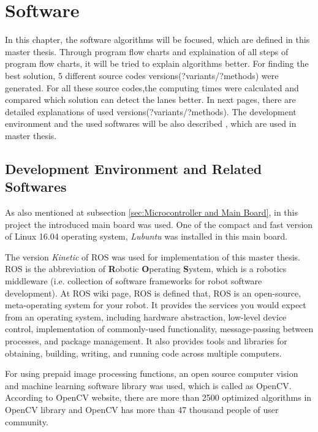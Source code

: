 %
\section{Software}\label{sec:Software}


In this chapter, the software algorithms will be focused, which are defined in this master thesis.  Through program flow charts and explaination of all steps of program flow charts, it will be tried to explain algorithms better. For finding the best solution, 5 different source codes versions(?variants/?methods) were generated. For all these source codes,the computing times were calculated and compared which solution can detect the lanes better. In next pages, there are detailed explanations of used versions(?variants/?methods). The development environment and the used softwares will be also described , which are used in master thesis.

%
\subsection{Development Environment and Related Softwares}
\label{sec:Development Environment and Related Softwares}

As also mentioned at subsection \ref{sec:Microcontroller and Main Board}, in this project the introduced main board was used. One of the compact and fast version of Linux 16.04 operating system, \textit{Lubuntu} was installed in this main board.

The version \textit{Kinetic} of ROS was used for implementation of this master thesis. ROS is the abbreviation of \textbf{R}obotic \textbf{O}perating \textbf{S}ystem, which is a robotics middleware (i.e. collection of software frameworks for robot software development). At ROS wiki page\cite{ROS}, ROS is defined that, ROS is an open-source, meta-operating system for your robot. It provides the services you would expect from an operating system, including hardware abstraction, low-level device control, implementation of commonly-used functionality, message-passing between processes, and package management. It also provides tools and libraries for obtaining, building, writing, and running code across multiple computers.

For using prepaid image processing functions, an open source computer vision and machine learning software library was used, which is called as OpenCV. According to OpenCV website\cite{OpenCV}, there are more than 2500 optimized algorithms in OpenCV library and OpenCV has more than 47 thousand people of user community.

